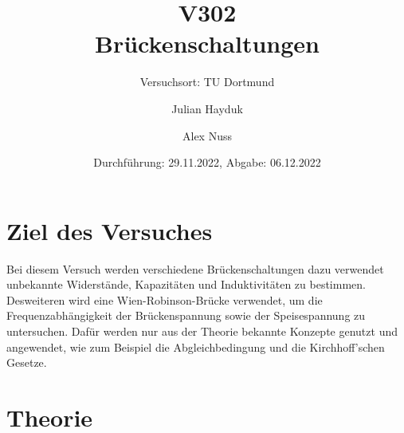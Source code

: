 \documentclass[
  bibliography=totoc,     %
  captions=tableheading,  %
  titlepage=firstiscover, %
]{scrartcl}
\begin{document}
  \setlength{\parindent}{0em} %
  \pagestyle{scrheadings}
  \clearpairofpagestyles
  \ofoot{\pagemark}

  \title{V302\\ Brückenschaltungen}
  \author{Julian Hayduk \and Alex Nuss}
  \date{Durchführung: 29.11.2022, Abgabe: 06.12.2022}
  \subtitle{Versuchsort: TU Dortmund }
  \maketitle

  \thispagestyle{empty}
  \newpage
  
  \tableofcontents
  \thispagestyle{empty}
  \setcounter{page}{1}
  
  \newpage
  \section{Ziel des Versuches}
  \label{sec:Ziel des Versuches}

  Bei diesem Versuch werden verschiedene Brückenschaltungen dazu verwendet unbekannte Widerstände, Kapazitäten und Induktivitäten
  zu bestimmen. Desweiteren wird eine Wien-Robinson-Brücke verwendet, um die Frequenzabhängigkeit der Brückenspannung sowie der 
  Speisespannung zu untersuchen. Dafür werden nur aus der Theorie bekannte Konzepte genutzt und angewendet, wie zum Beispiel
  die Abgleichbedingung und die Kirchhoff'schen Gesetze.
  
  \section{Theorie}
	\label{sec:Theorie}
\end{document}
